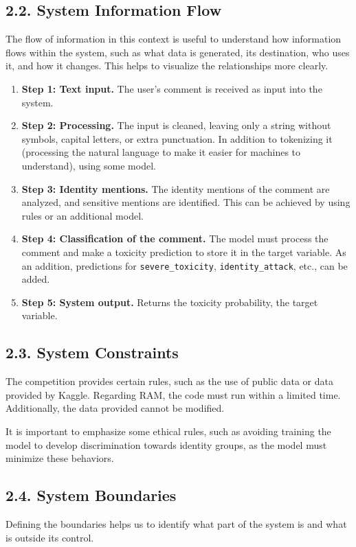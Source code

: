 \documentclass[a4paper,12pt]{article}
\begin{document}
\subsection*{2.2. System Information Flow}
The flow of information in this context is useful to understand how information flows within the system, such as what data is generated, its destination, who uses it, and how it changes. This helps to visualize the relationships more clearly.
\begin{enumerate}
\item \textbf{Step 1: Text input.} The user's comment is received as input into the system.
\item \textbf{Step 2: Processing.} The input is cleaned, leaving only a string without symbols, capital letters, or extra punctuation. In addition to tokenizing it (processing the natural language to make it easier for machines to understand), using some model.
\item \textbf{Step 3: Identity mentions.} The identity mentions of the comment are analyzed, and sensitive mentions are identified. This can be achieved by using rules or an additional model.
\item \textbf{Step 4: Classification of the comment.} The model must process the comment and make a toxicity prediction to store it in the target variable. As an addition, predictions for \texttt{severe\_toxicity}, \texttt{identity\_attack}, etc., can be added.
\item \textbf{Step 5: System output.} Returns the toxicity probability, the target variable.
\end{enumerate}

\subsection*{2.3. System Constraints}
The competition provides certain rules, such as the use of public data or data provided by Kaggle. Regarding RAM, the code must run within a limited time. Additionally, the data provided cannot be modified.

It is important to emphasize some ethical rules, such as avoiding training the model to develop discrimination towards identity groups, as the model must minimize these behaviors.

\subsection*{2.4. System Boundaries}
Defining the boundaries helps us to identify what part of the system is and what is outside its control.
\end{document}
